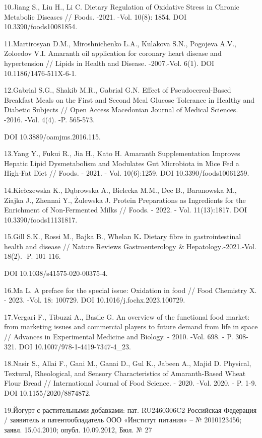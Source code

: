 {10.Jiang S., Liu H., Li C. Dietary Regulation of Oxidative Stress in
Chronic Metabolic Diseases // Foods. -2021. -Vol. 10(8): 1854. DOI
10.3390/foods10081854.

11.Martirosyan D.M., Miroshnichenko L.A., Kulakova S.N., Pogojeva A.V.,
Zoloedov V.I. Amaranth oil application for coronary heart disease and
hypertension // Lipids in Health and Disease\emph{.} -2007.-Vol. 6(1).
DOI 10.1186/1476-511X-6-1.

12.Gabrial S.G., Shakib M.R., Gabrial G.N. Effect of Pseudocereal-Based
Breakfast Meals on the First and Second Meal Glucose Tolerance in
Healthy and Diabetic Subjects // Open Access Macedonian Journal of
Medical Sciences. -2016. -Vol. 4(4). -P. 565-573.

DOI 10.3889/oamjms.2016.115.

13.Yang Y., Fukui R., Jia H., Kato H. Amaranth Supplementation Improves
Hepatic Lipid Dysmetabolism and Modulates Gut Microbiota in Mice Fed a
High-Fat Diet // Foods\emph{.} - 2021. - Vol. 10(6):1259. DOI
10.3390/foods10061259.

14.Kiełczewska K., Dąbrowska A., Bielecka M.M., Dec B., Baranowska M.,
Ziajka J., Zhennai Y., Żulewska J. Protein Preparations as Ingredients
for the Enrichment of Non-Fermented Milks // Foods. - 2022. - Vol.
11(13):1817. DOI 10.3390/foods11131817.

15.Gill S.K., Rossi M., Bajka B., Whelan K{\bfseries .} Dietary fibre in
gastrointestinal health and disease // Nature Reviews Gastroenterology
\& Hepatology\emph{.}-2021.-Vol. 18(2). -P. 101-116.

DOI 10.1038/s41575-020-00375-4.

16.Ma L. A preface for the special issue: Oxidation in food // Food
Chemistry X. - 2023. -Vol. 18: 100729. DOI 10.1016/j.fochx.2023.100729.

17.Vergari F., Tibuzzi A., Basile G. An overview of the functional food
market: from marketing issues and commercial players to future demand
from life in space // Advances in Experimental Medicine and Biology. -
2010. -Vol. 698. - P. 308-321. DOI 10.1007/978-1-4419-7347-4\_23.

18.Nasir S., Allai F., Gani M., Ganai D., Gul K., Jabeen A., Majid D.
Physical, Textural, Rheological, and Sensory Characteristics of
Amaranth-Based Wheat Flour Bread // International Journal of Food
Science. - 2020. -Vol. 2020. - P. 1-9. DOI 10.1155/2020/8874872.

19.Йогурт с растительными добавками: пат. RU2460306C2 Российская
Федерация / заявитель и патентообладатель ООО «Институт питания» -- №
2010123456; заявл. 15.04.2010; опубл. 10.09.2012, Бюл. № 27

}
